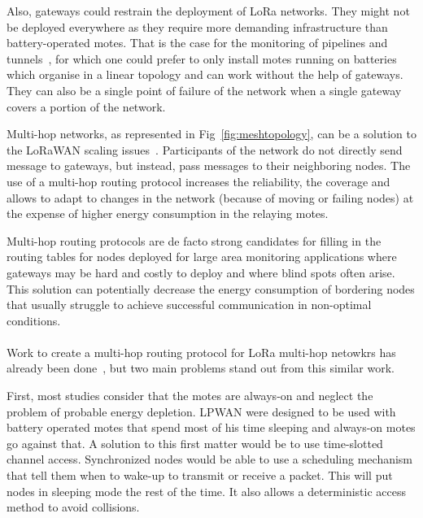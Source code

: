 Also, gateways could restrain the deployment of LoRa networks.
They might not be deployed everywhere as they require more demanding infrastructure
than battery-operated motes.
That is the case for the monitoring of pipelines and tunnels~\cite{Abrardo_2019},
for which one could prefer to only install motes running on batteries
which organise in a linear topology and can work without the help of gateways.
They can also be a single point of failure of the network when a single
gateway covers a portion of the network.



Multi-hop networks, as represented in Fig~\ref{fig:meshtopology}, can be a solution to
the LoRaWAN scaling issues~\cite{8115756}.
Participants of the network do not directly send message to gateways, but
instead, pass messages to their neighboring nodes.
The use of a multi-hop routing protocol increases the reliability, the coverage
and allows to adapt to changes in the network (because of moving or failing nodes)
at the expense of higher energy consumption in the relaying motes.

Multi-hop routing protocols are de facto strong candidates for filling in the
routing tables for nodes deployed for large area monitoring
applications where gateways may be hard and costly to deploy and where blind
spots often arise.
This solution can potentially decrease the energy consumption of bordering
nodes that usually struggle to achieve successful communication in non-optimal
conditions.

\paragraph{}

Work to create a multi-hop routing protocol for LoRa multi-hop netowkrs has
already been done~\cite{8115756, DIAS2018424, 8856256, Abrardo_2019, duong2018},
but two main problems stand out from this similar work.

First, most studies consider that the motes are always-on and
neglect the problem of probable energy depletion.
LPWAN were designed to be used with battery operated motes that spend most of
his time sleeping and always-on motes go against that.
A solution to this first matter would be to use time-slotted channel access.
Synchronized nodes would be able to use a scheduling mechanism that tell them
when to wake-up to transmit or receive a packet.
This will put nodes in sleeping mode the rest of the time.
It also allows a deterministic access method to avoid collisions.

